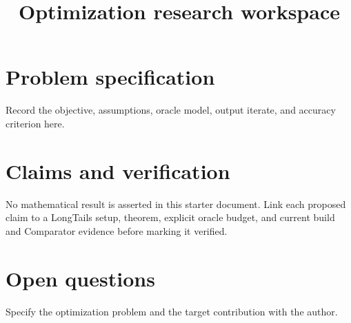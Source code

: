 \documentclass[11pt]{article}
\title{Optimization research workspace}
\author{}
\date{}
\begin{document}
\maketitle
\section{Problem specification}
Record the objective, assumptions, oracle model, output iterate, and accuracy criterion here.
\section{Claims and verification}
No mathematical result is asserted in this starter document.
Link each proposed claim to a LongTails setup, theorem, explicit oracle budget,
and current build and Comparator evidence before marking it verified.
\section{Open questions}
Specify the optimization problem and the target contribution with the author.
\end{document}
